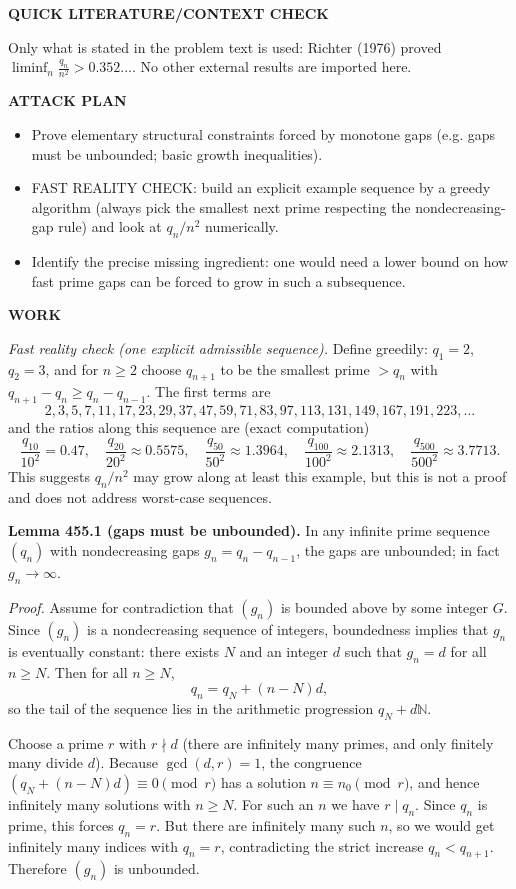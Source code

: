 \textbf{QUICK LITERATURE/CONTEXT CHECK}

Only what is stated in the problem text is used: Richter (1976) proved
$\liminf_n \frac{q_n}{n^2}>0.352\dots$.
No other external results are imported here.

\textbf{ATTACK PLAN}

\begin{itemize}
\item Prove elementary structural constraints forced by monotone gaps (e.g. gaps must be unbounded; basic growth inequalities).
\item FAST REALITY CHECK: build an explicit example sequence by a greedy algorithm (always pick the smallest next prime respecting the nondecreasing-gap rule) and look at $q_n/n^2$ numerically.
\item Identify the precise missing ingredient: one would need a lower bound on how fast prime gaps can be forced to grow in such a subsequence.
\end{itemize}

\textbf{WORK}

\emph{Fast reality check (one explicit admissible sequence).}
Define greedily: $q_1=2$, $q_2=3$, and for $n\ge 2$ choose $q_{n+1}$ to be the smallest prime $>q_n$ with $q_{n+1}-q_n\ge q_n-q_{n-1}$.
The first terms are
\[
2,3,5,7,11,17,23,29,37,47,59,71,83,97,113,131,149,167,191,223,\dots
\]
and the ratios along this sequence are (exact computation)
\[
\frac{q_{10}}{10^2}=0.47,\quad \frac{q_{20}}{20^2}\approx 0.5575,\quad \frac{q_{50}}{50^2}\approx 1.3964,\quad \frac{q_{100}}{100^2}\approx 2.1313,\quad \frac{q_{500}}{500^2}\approx 3.7713.
\]
This suggests $q_n/n^2$ may grow along at least this example, but this is not a proof and does not address worst-case sequences.

\medskip

\textbf{Lemma 455.1 (gaps must be unbounded).}
In any infinite prime sequence $(q_n)$ with nondecreasing gaps $g_n=q_n-q_{n-1}$, the gaps are unbounded; in fact $g_n\to\infty$.

\emph{Proof.}
Assume for contradiction that $(g_n)$ is bounded above by some integer $G$. Since $(g_n)$ is a nondecreasing sequence of integers, boundedness implies that $g_n$ is eventually constant: there exists $N$ and an integer $d$ such that $g_n=d$ for all $n\ge N$.
Then for all $n\ge N$,
\[
q_{n}=q_N+(n-N)d,
\]
so the tail of the sequence lies in the arithmetic progression $q_N+d\mathbb N$.

Choose a prime $r$ with $r\nmid d$ (there are infinitely many primes, and only finitely many divide $d$).
Because $\gcd(d,r)=1$, the congruence $(q_N+(n-N)d)\equiv 0\pmod r$ has a solution $n\equiv n_0\pmod r$, and hence infinitely many solutions with $n\ge N$.
For such an $n$ we have $r\mid q_n$. Since $q_n$ is prime, this forces $q_n=r$.
But there are infinitely many such $n$, so we would get infinitely many indices with $q_n=r$, contradicting the strict increase $q_n<q_{n+1}$.
Therefore $(g_n)$ is unbounded.

